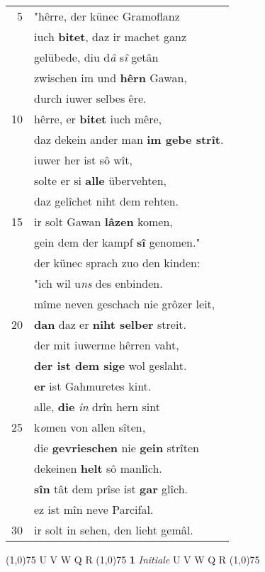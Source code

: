\documentclass[8pt,a4paper,notitlepage]{article}
\begin{document}
\begin{table}[ht]
\begin{minipage}[t]{0.5\linewidth}
\begin{tabular}{rl}
5 & "hêrre, der künec Gramoflanz\\ 
 & iuch \textbf{bitet}, daz ir machet ganz\\ 
 & gelübede, diu d\textit{â} s\textit{î} getân\\ 
 & zwischen im und \textbf{hêrn} Gawan,\\ 
 & durch iuwer selbes êre.\\ 
10 & hêrre, er \textbf{bitet} iuch mêre,\\ 
 & daz dekein ander man \textbf{im gebe strît}.\\ 
 & iuwer her ist sô wît,\\ 
 & solte er si \textbf{alle} übervehten,\\ 
 & daz gelîchet niht dem rehten.\\ 
15 & ir solt Gawan \textbf{lâzen} komen,\\ 
 & gein dem der kampf \textbf{sî} genomen."\\ 
 & der künec sprach zuo den kinden:\\ 
 & "ich wil u\textit{ns} des enbinden.\\ 
 & mîme neven geschach nie grôzer leit,\\ 
20 & \textbf{dan} daz er \textbf{niht selber} streit.\\ 
 & der mit iuwerme hêrren vaht,\\ 
 & \textbf{der ist dem sige} wol geslaht.\\ 
 & \textbf{er} ist Gahmuretes kint.\\ 
 & alle, \textbf{die} \textit{in} drîn hern sint\\ 
25 & k\textit{o}men von allen sîten,\\ 
 & die \textbf{gevrieschen} nie \textbf{gein} strîten\\ 
 & dekeinen \textbf{helt} sô manlîch.\\ 
 & \textbf{sîn} tât dem prîse ist \textbf{gar} glîch.\\ 
 & ez ist mîn neve Parcifal.\\ 
30 & ir solt in sehen, den lieht gemâl.\\ 
\end{tabular}
\scriptsize
\line(1,0){75} \newline
U V W Q R \newline
\line(1,0){75} \newline
\textbf{1} \textit{Initiale} U V W Q R  \newline
\line(1,0){75} \newline

\end{minipage}
\end{table}
\end{document}

